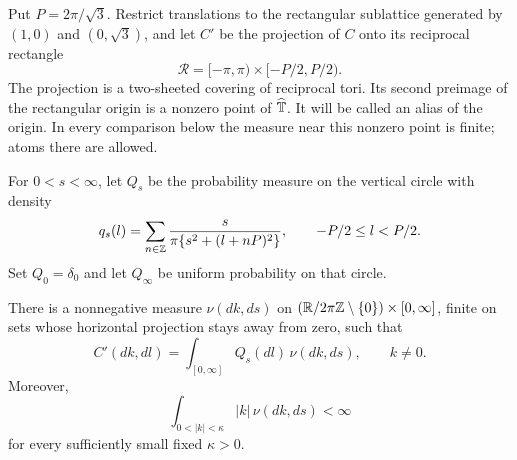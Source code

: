 Put \(P=2\pi/\sqrt3\). Restrict translations to the rectangular sublattice
generated by \((1,0)\) and \((0,\sqrt3)\), and let \(C'\) be the projection
of \(C\) onto its reciprocal rectangle
\[
 \mathcal R=[-\pi,\pi)\times[-P/2,P/2).
\]
The projection is a two-sheeted covering of reciprocal tori. Its second
preimage of the rectangular origin is a nonzero point of \(\widehat{\mathbb T}\).
It will be called an alias of the origin. In every comparison below the
measure near this nonzero point is finite; atoms there are allowed.

For \(0<s<\infty\), let \(Q_s\) be the probability measure on the vertical
circle with density
\begin{equation}
 \label{eq:periodized-cauchy}
 q_s(l)=\sum_{n\in\mathbb Z}\frac{s}{\pi\{s^2+(l+nP)^2\}},
       \qquad -P/2\le l<P/2.
\end{equation}
Set \(Q_0=\delta_0\) and let \(Q_\infty\) be uniform probability on that circle.

\begin{proposition}
\label{prop:cauchy-mixture}
There is a nonnegative measure \(\nu(dk,ds)\) on
\((\mathbb R/2\pi\mathbb Z\setminus\{0\})\times[0,\infty]\), finite on sets whose
horizontal projection stays away from zero, such that
\begin{equation}
 \label{eq:cauchy-mixture}
 C'(dk,dl)=\int_{[0,\infty]}Q_s(dl)\,\nu(dk,ds),\qquad k\ne0.
\end{equation}
Moreover,
\begin{equation}
 \label{eq:weighted-nu}
 \int_{0<|k|<\kappa}|k|\,\nu(dk,ds)<\infty
\end{equation}
for every sufficiently small fixed \(\kappa>0\).
\end{proposition}

